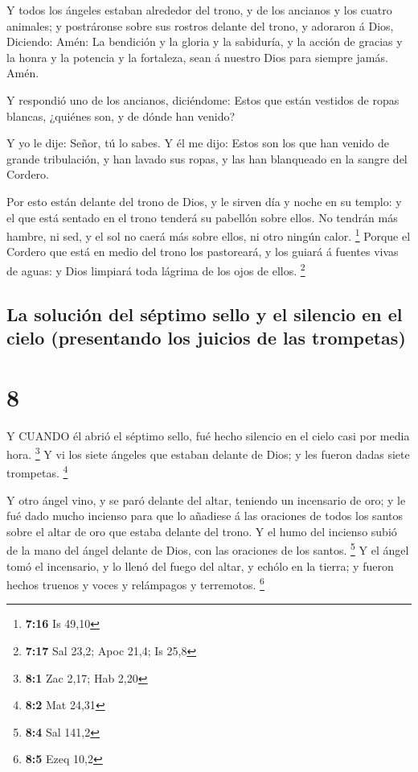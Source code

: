  Y todos los ángeles estaban alrededor del trono, y de los
ancianos y los cuatro animales; y postráronse sobre sus rostros delante
del trono, y adoraron á Dios,  Diciendo: Amén: La bendición
y la gloria y la sabiduría, y la acción de gracias y la honra y la
potencia y la fortaleza, sean á nuestro Dios para siempre jamás. Amén.

 Y respondió uno de los ancianos, diciéndome: Estos que
están vestidos de ropas blancas, ¿quiénes son, y de dónde han venido?

 Y yo le dije: Señor, tú lo sabes. Y él me dijo: Estos son
los que han venido de grande tribulación, y han lavado sus ropas, y las
han blanqueado en la sangre del Cordero.

 Por esto están delante del trono de Dios, y le sirven día
y noche en su templo: y el que está sentado en el trono tenderá su
pabellón sobre ellos.  No tendrán más hambre, ni sed, y el
sol no caerá más sobre ellos, ni otro ningún calor. \footnote{\textbf{7:16}
  Is 49,10}  Porque el Cordero que está en medio del trono
los pastoreará, y los guiará á fuentes vivas de aguas: y Dios limpiará
toda lágrima de los ojos de ellos. \footnote{\textbf{7:17} Sal 23,2;
  Apoc 21,4; Is 25,8}

\hypertarget{la-soluciuxf3n-del-suxe9ptimo-sello-y-el-silencio-en-el-cielo-presentando-los-juicios-de-las-trompetas}{%
\subsection{La solución del séptimo sello y el silencio en el cielo
(presentando los juicios de las
trompetas)}\label{la-soluciuxf3n-del-suxe9ptimo-sello-y-el-silencio-en-el-cielo-presentando-los-juicios-de-las-trompetas}}

\hypertarget{section-7}{%
\section{8}\label{section-7}}

 Y CUANDO él abrió el séptimo sello, fué hecho silencio en
el cielo casi por media hora. \footnote{\textbf{8:1} Zac 2,17; Hab 2,20}
 Y vi los siete ángeles que estaban delante de Dios; y les
fueron dadas siete trompetas. \footnote{\textbf{8:2} Mat 24,31}

 Y otro ángel vino, y se paró delante del altar, teniendo un
incensario de oro; y le fué dado mucho incienso para que lo añadiese á
las oraciones de todos los santos sobre el altar de oro que estaba
delante del trono.  Y el humo del incienso subió de la mano
del ángel delante de Dios, con las oraciones de los santos. \footnote{\textbf{8:4}
  Sal 141,2}  Y el ángel tomó el incensario, y lo llenó del
fuego del altar, y echólo en la tierra; y fueron hechos truenos y voces
y relámpagos y terremotos. \footnote{\textbf{8:5} Ezeq 10,2}

